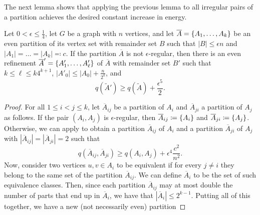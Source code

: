         The next lemma shows that applying the previous lemma to all irregular pairs of a partition achieves the desired
        constant increase in energy.

        \begin{lemma} \label{lem:increase_in_energy_when_refining_an_irregular_partition}
            Let $0 < \epsilon \leq \frac{1}{4}$, let $G$ be a graph with $n$ vertices, and let
            $\overline{A} = \{ A_1, \dots, A_k \}$ be an even partition of its vertex set with remainder set $B$ such that
            $|B| \leq \epsilon n$ and $|A_1| = \dots = |A_k| \eqqcolon c$.
            If the partition $\overline{A}$ is not $\epsilon$-regular, then there is an even refinement
            $\overline{A}' = \{ A'_1, \dots, A'_\ell \}$ of $\overline{A}$ with remainder set $B'$ such that
            $k \leq \ell \leq k 4^{k+1}$, $|A'_0| \leq |A_0| + \frac{n}{2^k}$, and
            \[
                q(\widetilde{A}') \geq q(\widetilde{A}) + \frac{\epsilon^5}{2}.
            \]
            \begin{proof}
                For all $1 \leq i < j \leq k$, let $\overline{A}_{ij}$ be a partition of $A_i$ and $\overline{A}_{ji}$ a
                partition of $A_j$ as follows.
                If the pair $(A_i, A_j)$ is $\epsilon$-regular, then $\overline{A}_{ij} \coloneqq \{ A_i \}$ and
                $\overline{A}_{ji} \coloneqq \{ A_j \}$.
                Otherwise, we can apply  to obtain a
                partition $\overline{A}_{ij}$ of $A_i$ and a partition $\overline{A}_{ji}$ of $A_j$ with
                $|\overline{A}_{ij}| = |\overline{A}_{ji}| = 2$ such that
                \begin{equation} \label{eq:increase_in_energy_in_refined_ij_pair}
                    q(\overline{A}_{ij}, \overline{A}_{ji}) \geq q(A_i, A_j) + \epsilon^4 \frac{c^2}{n^2}.
                \end{equation}
                Now, consider two vertices $u, v \in A_i$ to be equivalent if for every $j \neq i$ they belong to the
                same set of the partition $\overline{A}_{ij}$.
                We can define $\overline{A}_i$ to be the set of such equivalence classes.
                Then, since each partition $\overline{A}_{ij}$ may at most double the number of parts that end up in
                $\overline{A}_i$, we have that $|\overline{A}_i| \leq 2^{k-1}$.
                Putting all of this together, we have a new (not necessarily even) partition

\end{proof}
\end{lemma}
